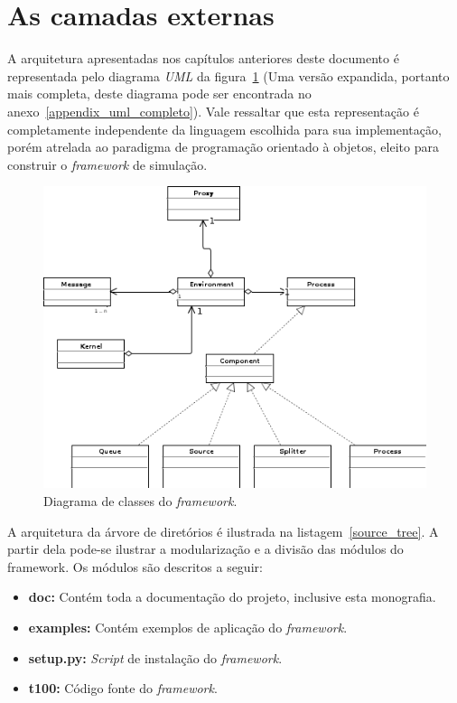 \section{As camadas externas}

A arquitetura apresentadas nos capítulos anteriores deste documento é representada pelo diagrama \textit{UML} da figura~\ref{fig:arquitetura_uml_geral} (Uma versão expandida, portanto mais completa, deste diagrama pode ser encontrada no anexo~\ref{appendix_uml_completo}). Vale ressaltar que esta representação é completamente independente da linguagem escolhida para sua implementação, porém atrelada ao paradigma de programação orientado à objetos, eleito para construir o \textit{framework} de simulação.

\begin{figure}
  \centerline{\includegraphics{arquitetura_uml_geral.png}}
  \caption{Diagrama de classes do \textit{framework}.}
\label{fig:arquitetura_uml_geral}
\end{figure}

A arquitetura da árvore de diretórios é ilustrada na listagem~\ref{source_tree}. A partir dela pode-se ilustrar a modularização e a divisão das módulos do framework. Os módulos são descritos a seguir:



\begin{itemize}
\item \textbf{doc:} Contém toda a documentação do projeto, inclusive esta monografia.
\item \textbf{examples:} Contém exemplos de aplicação do \emph{framework}.
\item \textbf{setup.py:} \emph{Script} de instalação do \textit{framework}.
\item \textbf{t100:} Código fonte do \textit{framework}.
\end{itemize}

